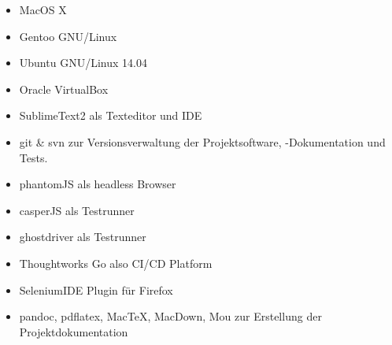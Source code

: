 \begin{itemize}
\itemsep1pt\parskip0pt
\item
  MacOS X
\item
  Gentoo GNU/Linux
\item
  Ubuntu GNU/Linux 14.04
\item
  Oracle VirtualBox
\item
  SublimeText2 als Texteditor und \acs{IDE}
\item
  git \& svn zur Versionsverwaltung der Projektsoftware, -Dokumentation
  und Tests.
\item
  phantomJS als headless Browser
\item
  casperJS als Testrunner
\item
  ghostdriver als Testrunner
\item
  Thoughtworks Go also CI/CD Platform
\item
  SeleniumIDE Plugin für Firefox
\item
  pandoc, pdflatex, MacTeX, MacDown, Mou zur Erstellung der
  Projektdokumentation
\end{itemize}

% 
% 
% 
% 

% 


% 
